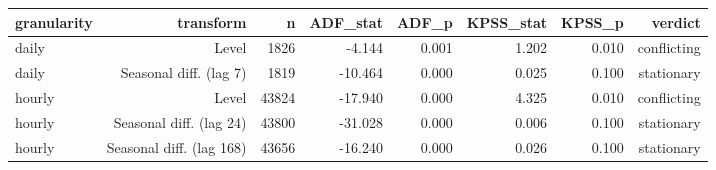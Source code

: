 \begin{tabular}{lrrrrrrr}
\toprule
granularity & transform & n & ADF\_stat & ADF\_p & KPSS\_stat & KPSS\_p & verdict \\
\midrule
daily & Level & 1826 & -4.144 & 0.001 & 1.202 & 0.010 & conflicting \\
daily & Seasonal diff. (lag 7) & 1819 & -10.464 & 0.000 & 0.025 & 0.100 & stationary \\
hourly & Level & 43824 & -17.940 & 0.000 & 4.325 & 0.010 & conflicting \\
hourly & Seasonal diff. (lag 24) & 43800 & -31.028 & 0.000 & 0.006 & 0.100 & stationary \\
hourly & Seasonal diff. (lag 168) & 43656 & -16.240 & 0.000 & 0.026 & 0.100 & stationary \\
\bottomrule
\end{tabular}

